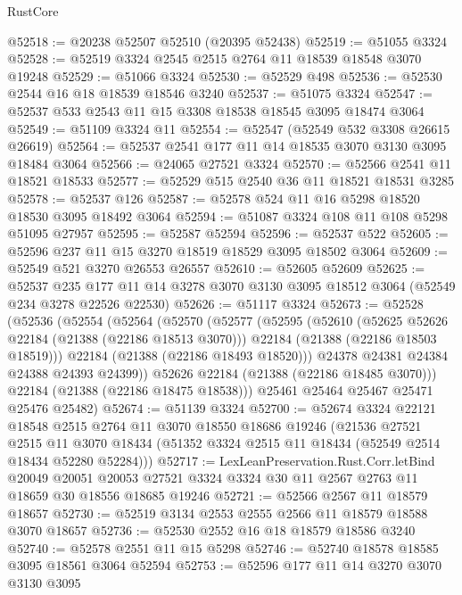 \begin{lexlean}{RustCore}
\begin{coremodule}
@52518 := @20238 @52507 @52510 (@20395 @52438)
@52519 := @51055 @3324
@52528 := @52519 @3324 @2545 @2515 @2764 @11 @18539 @18548 @3070 @19248
@52529 := @51066 @3324
@52530 := @52529 @498
@52536 := @52530 @2544 @16 @18 @18539 @18546 @3240
@52537 := @51075 @3324
@52547 := @52537 @533 @2543 @11 @15 @3308 @18538 @18545 @3095 @18474 @3064
@52549 := @51109 @3324 @11
@52554 := @52547 (@52549 @532 @3308 @26615 @26619)
@52564 := @52537 @2541 @177 @11 @14 @18535 @3070 @3130 @3095 @18484 @3064
@52566 := @24065 @27521 @3324
@52570 := @52566 @2541 @11 @18521 @18533
@52577 := @52529 @515 @2540 @36 @11 @18521 @18531 @3285
@52578 := @52537 @126
@52587 := @52578 @524 @11 @16 @5298 @18520 @18530 @3095 @18492 @3064
@52594 := @51087 @3324 @108 @11 @108 @5298 @51095 @27957
@52595 := @52587 @52594
@52596 := @52537 @522
@52605 := @52596 @237 @11 @15 @3270 @18519 @18529 @3095 @18502 @3064
@52609 := @52549 @521 @3270 @26553 @26557
@52610 := @52605 @52609
@52625 := @52537
    @235
    @177
    @11
    @14
    @3278
    @3070
    @3130
    @3095
    @18512
    @3064
    (@52549 @234 @3278 @22526 @22530)
@52626 := @51117 @3324
@52673 := @52528
    (@52536
      (@52554
        (@52564
          (@52570
            (@52577
              (@52595
                (@52610
                  (@52625 @52626 @22184 (@21388 (@22186 @18513 @3070)))
                  @22184
                  (@21388 (@22186 @18503 @18519)))
                @22184
                (@21388 (@22186 @18493 @18520)))
              @24378
              @24381
              @24384
              @24388
              @24393
              @24399))
          @52626
          @22184
          (@21388 (@22186 @18485 @3070)))
        @22184
        (@21388 (@22186 @18475 @18538)))
      @25461
      @25464
      @25467
      @25471
      @25476
      @25482)
@52674 := @51139 @3324
@52700 := @52674
    @3324
    @22121
    @18548
    @2515
    @2764
    @11
    @3070
    @18550
    @18686
    @19246
    (@21536
      @27521
      @2515
      @11
      @3070
      @18434
      (@51352 @3324 @2515 @11 @18434 (@52549 @2514 @18434 @52280 @52284)))
@52717 := LexLeanPreservation.Rust.Corr.letBind
    @20049
    @20051
    @20053
    @27521
    @3324
    @3324
    @30
    @11
    @2567
    @2763
    @11
    @18659
    @30
    @18556
    @18685
    @19246
@52721 := @52566 @2567 @11 @18579 @18657
@52730 := @52519 @3134 @2553 @2555 @2566 @11 @18579 @18588 @3070 @18657
@52736 := @52530 @2552 @16 @18 @18579 @18586 @3240
@52740 := @52578 @2551 @11 @15 @5298
@52746 := @52740 @18578 @18585 @3095 @18561 @3064 @52594
@52753 := @52596 @177 @11 @14 @3270 @3070 @3130 @3095

\end{coremodule}
\end{lexlean}
